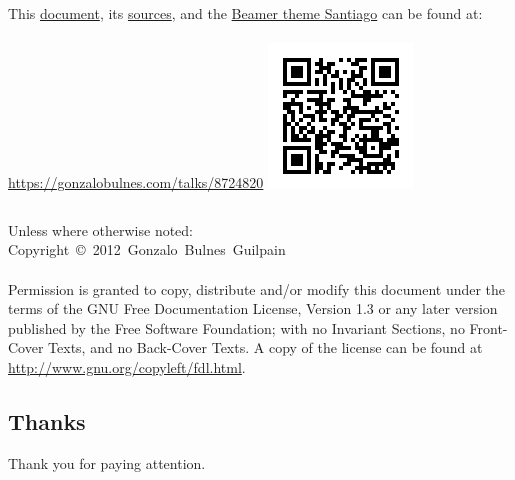   \begin{frame}{\insertsubsection}

    \footnotesize
      \begin{columns}
          This \href{https://gonzalobulnes.com/talks/8724820.pdf}{document}, its \href{https://gonzalobulnes.com/talks/8724820.tar.gz}{sources}, and the \href{https://gonzalobulnes.com/code/2347623.tar.gz}{Beamer theme Santiago} can be found at:\\~\\
          \url{https://gonzalobulnes.com/talks/8724820}    
        \hfill\includegraphics[width=\textwidth]{images/sources-talk.png}
      \end{columns}
    \normalsize

    \scriptsize{Unless where otherwise noted:}\\
    \noindent\scriptsize{Copyright~\copyright~2012~Gonzalo~Bulnes~Guilpain}\\~\\

    \scriptsize{Permission is granted to copy, distribute and/or modify this document
    under the terms of the GNU Free Documentation License, Version 1.3
    or any later version published by the Free Software Foundation;
    with no Invariant Sections, no Front-Cover Texts, and no Back-Cover Texts.
    A copy of the license can be found at \url{http://www.gnu.org/copyleft/fdl.html}.}
  \end{frame}

%
\subsection{Thanks}

  \begin{frame}
    \vspace{0mm}
    \begin{center}
      Thank you for paying attention.     
    \end{center}
  \end{frame}
